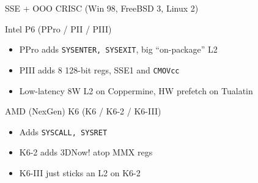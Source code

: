 \documentclass[mathserif,xcolor={dvipsnames,table}]{beamer}
\begin{document}
\begin{frame}[t]{SSE + OOO CRISC (Win 98, FreeBSD 3, Linux 2)}

\begin{block}{Intel P6 (PPro / PII / PIII)}
\begin{itemize}
\item PPro adds \texttt{SYSENTER, SYSEXIT}, big ``on-package'' L2
\item PIII adds 8 128-bit regs, SSE1 and \texttt{CMOVcc}
\item Low-latency 8W L2 on Coppermine, HW prefetch on Tualatin
\end{itemize}
\end{block}
\begin{block}{AMD (NexGen) K6 (K6 / K6-2 / K6-III)}
\begin{itemize}
\item Adds \texttt{SYSCALL, SYSRET}
\item K6-2 adds 3DNow! atop MMX regs
\item K6-III just sticks an L2 on K6-2
\end{itemize}
\end{block}
\vfill
\begin{center}
\end{center}
\end{frame}
\end{document}
